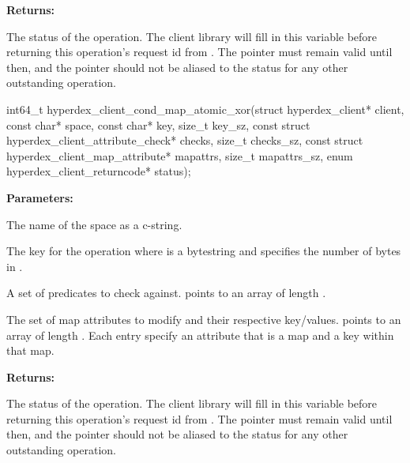 \noindent\textbf{Returns:}
\begin{description}[labelindent=\widthof{{\code{status}}},leftmargin=*,noitemsep,nolistsep,align=right]
\item[\code{status}] The status of the operation.  The client library will fill in this variable before returning this operation's request id from .  The pointer must remain valid until then, and the pointer should not be aliased to the status for any other outstanding operation.
\end{description}

\funcsep
{}
\begin{ccode}
int64_t hyperdex_client_cond_map_atomic_xor(struct hyperdex_client* client,
                const char* space,
                const char* key, size_t key_sz,
                const struct hyperdex_client_attribute_check* checks, size_t checks_sz,
                const struct hyperdex_client_map_attribute* mapattrs, size_t mapattrs_sz,
                enum hyperdex_client_returncode* status);
\end{ccode}
\funcdesc 

\noindent\textbf{Parameters:}
\begin{description}[labelindent=\widthof{{\code{mapattrs}, \code{mapattrs\_sz}}},leftmargin=*,noitemsep,nolistsep,align=right]
\item[\code{space}] The name of the space as a c-string.
\item[\code{key}, \code{key\_sz}] The key for the operation where  is a bytestring and  specifies the number of bytes in .
\item[\code{checks}, \code{checks\_sz}] A set of predicates to check against.   points to an array of length .
\item[\code{mapattrs}, \code{mapattrs\_sz}] The set of map attributes to modify and their respective key/values.   points to an array of length .  Each entry specify an attribute that is a map and a key within that map.
\end{description}

\noindent\textbf{Returns:}
\begin{description}[labelindent=\widthof{{\code{status}}},leftmargin=*,noitemsep,nolistsep,align=right]
\item[\code{status}] The status of the operation.  The client library will fill in this variable before returning this operation's request id from .  The pointer must remain valid until then, and the pointer should not be aliased to the status for any other outstanding operation.
\end{description}

